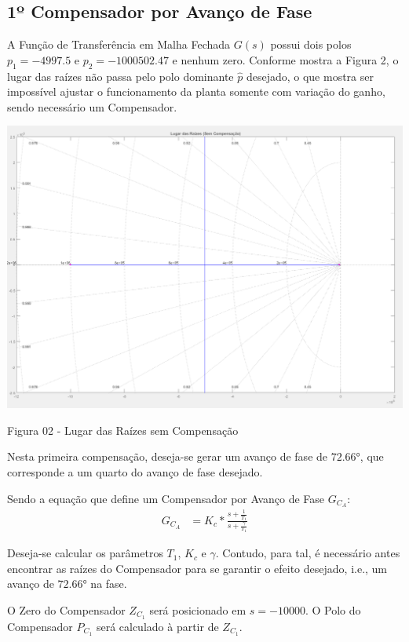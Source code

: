 \documentclass[a4paper]{article}
\begin{document}
	\subsection{1º Compensador por Avanço de Fase}
	\par A Função de Transferência em Malha Fechada $G(s)$ possui dois polos $p_1=-4997.5$ e $p_2=-1000502.47$ e nenhum zero. Conforme mostra a Figura 2, o lugar das raízes não passa pelo polo dominante $\hat{p}$ desejado, o que mostra ser impossível ajustar o funcionamento da planta somente com variação do ganho, sendo necessário um Compensador.
	\begin{center}
	\includegraphics[width=40em,keepaspectratio]{lugar_das_raizes_sem_compensacao}
	\par Figura 02 - Lugar das Raízes sem Compensação
	\end{center}
	
	\vspace{0.5em}
	\par Nesta primeira compensação, deseja-se gerar um avanço de fase de $\ang{72.66}$, que corresponde a um quarto do avanço de fase desejado.
	\vspace{0.5em}
	\par Sendo a equação que define um Compensador por Avanço de Fase $G_{C_A}$:
	\begin{align}
		G_{C_A} &= K_c * \frac{s+\frac{1}{T_1}}{s+\frac{\gamma}{T_1}}
	\end{align}
	\vspace{0.5em}
	\par Deseja-se calcular os parâmetros $T_1$, $K_c$ e $\gamma$. Contudo, para tal, é necessário antes encontrar as raízes do Compensador para se garantir o efeito desejado, i.e., um avanço de $\ang{72.66}$ na fase.
	\vspace{0.5em}
	\par O Zero do Compensador $Z_{C_1}$ será posicionado em $s=-10000$. O Polo do Compensador $P_{C_1}$ será calculado à partir de $Z_{C_1}$.
	
\end{document}
